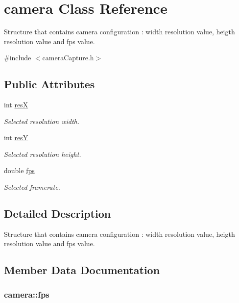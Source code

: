 \hypertarget{structcamera}{\section{camera Class Reference}
\label{structcamera}
}


Structure that contains camera configuration \-: width resolution value, heigth resolution value and fps value.  




{\ttfamily \#include $<$camera\-Capture.\-h$>$}

\subsection*{Public Attributes}
\begin{DoxyCompactItemize}
\item 
int \hyperlink{structcamera_a97ec97e570c8ce140f92213f44716f18}{res\-X}
\begin{DoxyCompactList}\small\item\em Selected resolution width. \end{DoxyCompactList}\item 
int \hyperlink{structcamera_a8b1040ede762f917f101589f4bcf06d3}{res\-Y}
\begin{DoxyCompactList}\small\item\em Selected resolution height. \end{DoxyCompactList}\item 
double \hyperlink{structcamera_ab833dd3e54afd3cf66079ed88b7286e5}{fps}
\begin{DoxyCompactList}\small\item\em Selected framerate. \end{DoxyCompactList}\end{DoxyCompactItemize}


\subsection{Detailed Description}
Structure that contains camera configuration \-: width resolution value, heigth resolution value and fps value. 

\subsection{Member Data Documentation}
\hypertarget{structcamera_ab833dd3e54afd3cf66079ed88b7286e5}{
\subsubsection[{fps}]{\setlength{\rightskip}{0pt plus 5cm}camera\-::fps}}\label{structcamera_ab833dd3e54afd3cf66079ed88b7286e5}


